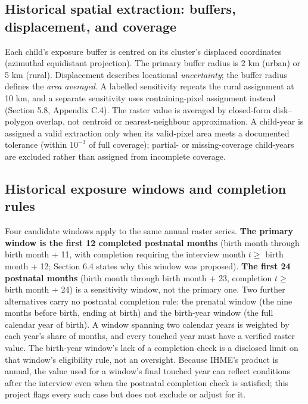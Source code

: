 \subsection{Historical spatial extraction: buffers, displacement, and coverage}\label{sec:3.6}

Each child's exposure buffer is centred on its cluster's displaced coordinates (azimuthal equidistant projection). The primary buffer radius is 2 km (urban) or 5 km (rural). Displacement describes locational \emph{uncertainty}; the buffer radius defines the \emph{area averaged}. A labelled sensitivity repeats the rural assignment at 10 km, and a separate sensitivity uses containing-pixel assignment instead (Section 5.8, Appendix C.4). The raster value is averaged by closed-form disk--polygon overlap, not centroid or nearest-neighbour approximation. A child-year is assigned a valid extraction only when its valid-pixel area meets a documented tolerance (within \(10^{-3}\) of full coverage); partial- or missing-coverage child-years are excluded rather than assigned from incomplete coverage.

\subsection{Historical exposure windows and completion rules}\label{sec:3.7}

Four candidate windows apply to the same annual raster series. \textbf{The primary window is the first 12 completed postnatal months} (birth month through birth month + 11, with completion requiring the interview month \(t \geq\) birth month + 12; Section 6.4 states why this window was proposed). \textbf{The first 24 postnatal months} (birth month through birth month + 23, completion \(t \geq\) birth month + 24) is a sensitivity window, not the primary one. Two further alternatives carry no postnatal completion rule: the prenatal window (the nine months before birth, ending at birth) and the birth-year window (the full calendar year of birth). A window spanning two calendar years is weighted by each year's share of months, and every touched year must have a verified raster value. The birth-year window's lack of a completion check is a disclosed limit on that window's eligibility rule, not an oversight. Because IHME's product is annual, the value used for a window's final touched year can reflect conditions after the interview even when the postnatal completion check is satisfied; this project flags every such case but does not exclude or adjust for it.

